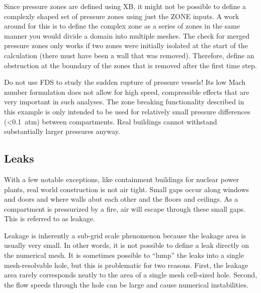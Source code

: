 \documentclass[11pt]{book}
\begin{document}
Since pressure zones are defined using {\ct XB}, it might not be possible to define a complexly shaped set of pressure zones using just the {\ct ZONE} inputs.  A work around for this is to define the complex zone as a series of zones in the same manner you would divide a domain into multiple meshes.  The check for merged pressure zones only works if two zones were initially isolated at the start of the calculation (there must have been a wall that was removed). Therefore, define an obstruction at the boundary of the zones that is removed after the first time step.

Do not use FDS to study the sudden rupture of pressure vessels! Its low Mach number formulation does not allow for high speed, compressible effects that
are very important in such analyses. The zone breaking functionality described in this example is only intended to be used for relatively small pressure differences (<0.1~atm) between compartments. Real buildings cannot withstand substantially larger pressures anyway.


\subsection{Leaks}
\label{info:Leaks}

With a few notable exceptions, like containment buildings for nuclear power plants, real world construction is not air tight.  Small gaps occur along windows and doors and where walls abut each other and the floors and ceilings.  As a compartment is pressurized by a fire, air will escape through these small gaps.  This is referred to as leakage.

Leakage is inherently a sub-grid scale phenomenon because the leakage area is usually very small. In other words, it is not possible to define a leak directly on the
numerical mesh. It is sometimes possible to ``lump'' the leaks into a single mesh-resolvable hole, but this is problematic
for two reasons. First, the leakage area rarely corresponds neatly to the area of a single mesh cell-sized hole. Second, the
flow speeds through the hole can be large and cause numerical instabilities.
\end{document}
